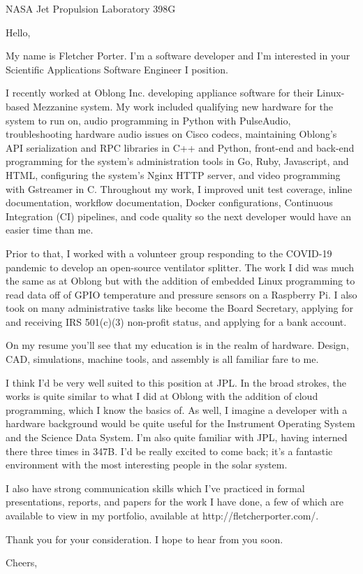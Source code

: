 \documentclass[12pt,american,german,british]{letter}
\begin{document}
\raggedright

\begin{letter}{NASA Jet Propulsion Laboratory 398G}

\opening{Hello,}

My name is Fletcher Porter.  I'm a software developer and I'm interested in
your Scientific Applications Software Engineer I position.

I recently worked at Oblong Inc. developing appliance software for their
Linux-based Mezzanine system.  My work included qualifying new hardware for the
system to run on, audio programming in Python with PulseAudio,
troubleshooting hardware audio issues on Cisco codecs, maintaining Oblong's API
serialization and RPC libraries in C++ and Python, front-end and back-end
programming for the system's administration tools in Go, Ruby, Javascript, and
HTML, configuring the system's Nginx HTTP server, and video programming with
Gstreamer in C.  Throughout my work, I improved unit test coverage, inline
documentation, workflow documentation, Docker configurations, Continuous
Integration (CI) pipelines, and code quality so the next developer would have
an easier time than me.

Prior to that, I worked with a volunteer group responding to the COVID-19
pandemic to develop an open-source ventilator splitter.  The work I did was
much the same as at Oblong but with the addition of embedded Linux programming
to read data off of GPIO temperature and pressure sensors on a Raspberry Pi.  I
also took on many administrative tasks like become the Board Secretary,
applying for and receiving IRS 501(c)(3) non-profit status, and applying for a
bank account.

On my resume you'll see that my education is in the realm of hardware.  Design, 
CAD, simulations, machine tools, and assembly is all familiar fare to me.

I think I'd be very well suited to this position at JPL.  In the broad strokes,
the works is quite similar to what I did at Oblong with the addition of cloud
programming, which I know the basics of.  As well, I imagine a developer with a
hardware background would be quite useful for the Instrument Operating System
and the Science Data System.  I'm also quite familiar with JPL, having interned
there three times in 347B.  I'd be really excited to come back; it's a
fantastic environment with the most interesting people in the solar system.

I also have strong communication skills which I've practiced in formal
presentations, reports, and papers for the work I have done, a few of which are
available to view in my portfolio, available at http://fletcherporter.com/.

Thank you for your consideration.  I hope to hear from you soon.


\closing{Cheers,}

\end{letter}
\end{document}
